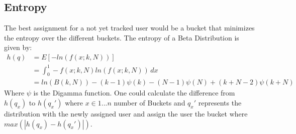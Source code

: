 \documentclass[../Thesis.tex]{subfiles}
\begin{document}
\subsection{Entropy}
The best assignment for a not yet tracked user would be a bucket that minimizes the entropy over the different buckets. The entropy of a Beta Distribution is given by:
\begin{align*}
h(q) 	&= E[-ln(f(x;k,N))] \\
		&= \int_{0}^{1} -f(x;k,N)ln(f(x;k,N))\,dx \\
		&= ln(B(k,N)) - (k-1) \psi(k) - (N-1) \psi(N) + (k+N-2) \psi(k+N)
\end{align*}
Where $\psi$ is the Digamma function. One could calculate the difference from $h(q_x)$ to $h(q_x')$ where $x \in {1...n}$ number of Buckets and $q_x'$ represents the distribution with the newly assigned user and assign the user the bucket where $max(|h(q_x)-h(q_x')|)$.
\end{document}
